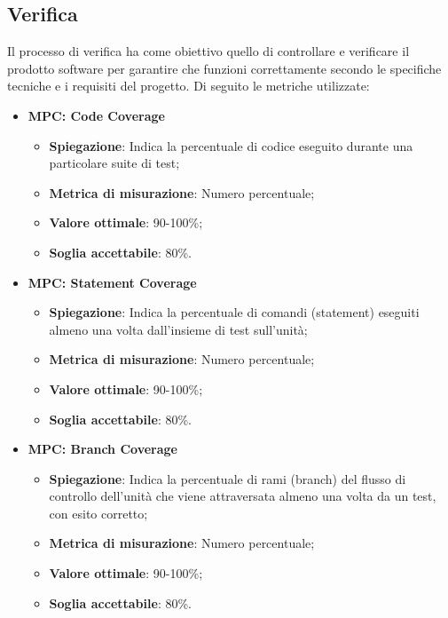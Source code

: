 \subsection{Verifica}
Il processo di verifica ha come obiettivo quello di controllare e verificare il prodotto software per garantire che funzioni correttamente secondo le specifiche tecniche e i requisiti del progetto. Di seguito le metriche utilizzate:

\begin{itemize}
    \item \textbf{MPC: Code Coverage}
    \begin{itemize}
        \item \textbf{Spiegazione}: Indica la percentuale di codice eseguito durante una particolare suite di test;
        \item \textbf{Metrica di misurazione}: Numero percentuale;
        \item \textbf{Valore ottimale}: 90-100\%;
        \item \textbf{Soglia accettabile}: 80\%.
    \end{itemize}
\end{itemize}

\begin{itemize}
    \item \textbf{MPC: Statement Coverage}
    \begin{itemize}
        \item \textbf{Spiegazione}: Indica la percentuale di comandi (statement) eseguiti almeno una volta dall'insieme di test sull'unità;
        \item \textbf{Metrica di misurazione}: Numero percentuale;
        \item \textbf{Valore ottimale}: 90-100\%;
        \item \textbf{Soglia accettabile}: 80\%.
    \end{itemize}
\end{itemize}

\begin{itemize}
    \item \textbf{MPC: Branch Coverage}
    \begin{itemize}
        \item \textbf{Spiegazione}: Indica la percentuale di rami (branch) del flusso di controllo dell'unità che viene attraversata almeno una volta da un test, con esito corretto;
        \item \textbf{Metrica di misurazione}: Numero percentuale;
        \item \textbf{Valore ottimale}: 90-100\%;
        \item \textbf{Soglia accettabile}: 80\%.
    \end{itemize}
\end{itemize}

